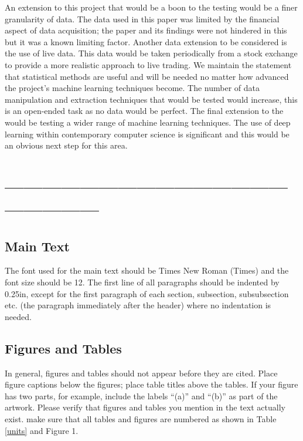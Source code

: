 \documentclass[conference]{IEEEtran}
\begin{document}
An extension to this project that would be a boon to the testing would be a finer granularity of data. The data used in this paper was limited by the financial aspect of data acquisition; the paper and its findings were not hindered in this but it was a known limiting factor. Another data extension to be  considered is the use of live data. This data would be taken periodically from a stock exchange to provide a more realistic approach to live trading. We maintain the statement that statistical methods are useful and will be needed no matter how advanced the project's machine learning techniques become. The number of data manipulation and extraction techniques that would be tested would increase, this is an open-ended task as no data would be perfect. The final extension to the would be testing a wider range of machine learning techniques. The use of deep learning within contemporary computer science is significant and this would be an obvious next step for this area.

\nocite{*}

\iffalse
\section*{------------------------------------------------------------}

\subsection{Main Text}

The font used for the main text should be Times New Roman (Times) and the font size should be 12.  The first line of all paragraphs should be indented by 0.25in, except for the first paragraph of each section, subsection, subsubsection etc. (the paragraph immediately after the header) where no indentation is needed.

\subsection{Figures and Tables}
In general, figures and tables should not appear before they are cited.  Place figure captions below the figures; place table titles above the tables.  If your figure has two parts, for example, include the labels ``(a)'' and ``(b)'' as part of the artwork.  Please verify that figures and tables you mention in the text actually exist.  make sure that all tables and figures are numbered as shown in Table \ref{units} and Figure 1.
\end{document}
